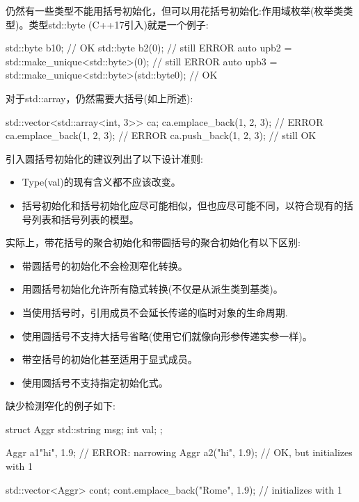仍然有一些类型不能用括号初始化，但可以用花括号初始化:作用域枚举(枚举类类型)。类型std::byte (C++17引入)就是一个例子:

\begin{cpp}
std::byte b1{0}; // OK
std::byte b2(0); // still ERROR
auto upb2 = std::make_unique<std::byte>(0); // still ERROR
auto upb3 = std::make_unique<std::byte>(std::byte{0}); // OK
\end{cpp}

对于std::array，仍然需要大括号(如上所述):

\begin{cpp}
std::vector<std::array<int, 3>> ca;
ca.emplace_back(1, 2, 3); // ERROR
ca.emplace_back({1, 2, 3}); // ERROR
ca.push_back({1, 2, 3}); // still OK
\end{cpp}


引入圆括号初始化的建议列出了以下设计准则:

\begin{itemize}
\item
Type(val)的现有含义都不应该改变。

\item
括号初始化和括号初始化应尽可能相似，但也应尽可能不同，以符合现有的括号列表和括号列表的模型。
\end{itemize}

实际上，带花括号的聚合初始化和带圆括号的聚合初始化有以下区别:

\begin{itemize}
\item
带圆括号的初始化不会检测窄化转换。

\item
用圆括号初始化允许所有隐式转换(不仅是从派生类到基类)。

\item
当使用括号时，引用成员不会延长传递的临时对象的生命周期.

\item
使用圆括号不支持大括号省略(使用它们就像向形参传递实参一样)。

\item
带空括号的初始化甚至适用于显式成员。

\item
使用圆括号不支持指定初始化式。
\end{itemize}

缺少检测窄化的例子如下:

\begin{cpp}
struct Aggr {
	std::string msg;
	int val;
};

Aggr a1{"hi", 1.9}; // ERROR: narrowing
Aggr a2("hi", 1.9); // OK, but initializes with 1

std::vector<Aggr> cont;
cont.emplace_back("Rome", 1.9); // initializes with 1
\end{cpp}

